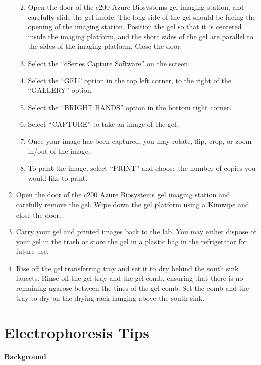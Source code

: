 \documentclass[
  letterpaper,
  DIV=11,
  numbers=noendperiod]{scrreprt}
\providecommand{\tightlist}{%
  \setlength{\itemsep}{0pt}\setlength{\parskip}{0pt}}\usepackage{longtable,booktabs,array}
\begin{document}
\begin{enumerate}
  \begin{enumerate}
  \def\labelenumii{\alph{enumii}.}
  \tightlist
  \item
    Open the door of the c200 Azure Biosystems gel imaging station, and
    carefully slide the gel inside. The long side of the gel should be
    facing the opening of the imaging station. Position the gel so that
    it is centered inside the imaging platform, and the short sides of
    the gel are parallel to the sides of the imaging platform. Close the
    door.
  \item
    Select the ``cSeries Capture Software'' on the screen.
  \item
    Select the ``GEL'' option in the top left corner, to the right of
    the ``GALLERY'' option.
  \item
    Select the ``BRIGHT BANDS'' option in the bottom right corner.
  \item
    Select ``CAPTURE'' to take an image of the gel.
  \item
    Once your image has been captured, you may rotate, flip, crop, or
    zoom in/out of the image.
  \item
    To print the image, select ``PRINT'' and choose the number of copies
    you would like to print.
  \end{enumerate}
\item
  Open the door of the c200 Azure Biosystems gel imaging station and
  carefully remove the gel. Wipe down the gel platform using a Kimwipe
  and close the door.
\item
  Carry your gel and printed images back to the lab. You may either
  dispose of your gel in the trash or store the gel in a plastic bag in
  the refrigerator for future use.
\item
  Rise off the gel transferring tray and set it to dry behind the south
  sink faucets. Rinse off the gel tray and the gel comb, ensuring that
  there is no remaining agarose between the tines of the gel comb. Set
  the comb and the tray to dry on the drying rack hanging above the
  south sink.
\end{enumerate}

\hypertarget{electrophoresis-tips-1}{%
\section{Electrophoresis Tips}\label{electrophoresis-tips-1}}

\textbf{Background}
\end{document}
